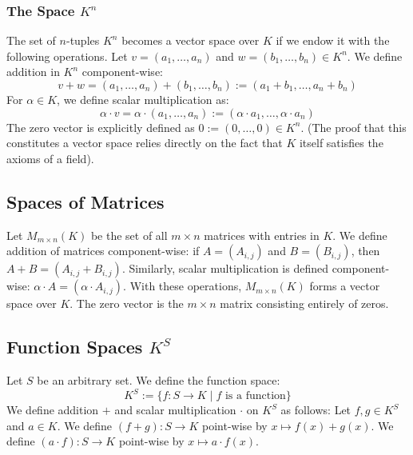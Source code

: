 \subsubsection{The Space $K^n$}
\begin{example}
The set of $n$-tuples $K^n$ becomes a vector space over $K$ if we endow it with the following operations. 
Let $v = (a_1, \dots, a_n)$ and $w = (b_1, \dots, b_n) \in K^n$. We define addition in $K^n$ component-wise:
\[
v + w = (a_1, \dots, a_n) + (b_1, \dots, b_n) := (a_1 + b_1, \dots, a_n + b_n)
\]
For $\alpha \in K$, we define scalar multiplication as:
\[
\alpha \cdot v = \alpha \cdot (a_1, \dots, a_n) := (\alpha \cdot a_1, \dots, \alpha \cdot a_n)
\]
The zero vector is explicitly defined as $0 := (0, \dots, 0) \in K^n$. 
(The proof that this constitutes a vector space relies directly on the fact that $K$ itself satisfies the axioms of a field).
\end{example}

\subsection{Spaces of Matrices}
\begin{example}
Let $M_{m \times n}(K)$ be the set of all $m \times n$ matrices with entries in $K$. We define addition of matrices component-wise: if $A = (A_{i,j})$ and $B = (B_{i,j})$, then $A + B = (A_{i,j} + B_{i,j})$. Similarly, scalar multiplication is defined component-wise: $\alpha \cdot A = (\alpha \cdot A_{i,j})$. With these operations, $M_{m \times n}(K)$ forms a vector space over $K$. The zero vector is the $m \times n$ matrix consisting entirely of zeros.
\end{example}

\subsection{Function Spaces $K^S$}
\begin{example}
Let $S$ be an arbitrary set. We define the function space:
\[
K^S := \{f: S \to K \mid f \text{ is a function}\}
\]
We define addition $+$ and scalar multiplication $\cdot$ on $K^S$ as follows: 
Let $f, g \in K^S$ and $a \in K$. 
We define $(f + g): S \to K$ point-wise by $x \mapsto f(x) + g(x)$.
We define $(a \cdot f): S \to K$ point-wise by $x \mapsto a \cdot f(x)$.
\end{example}

